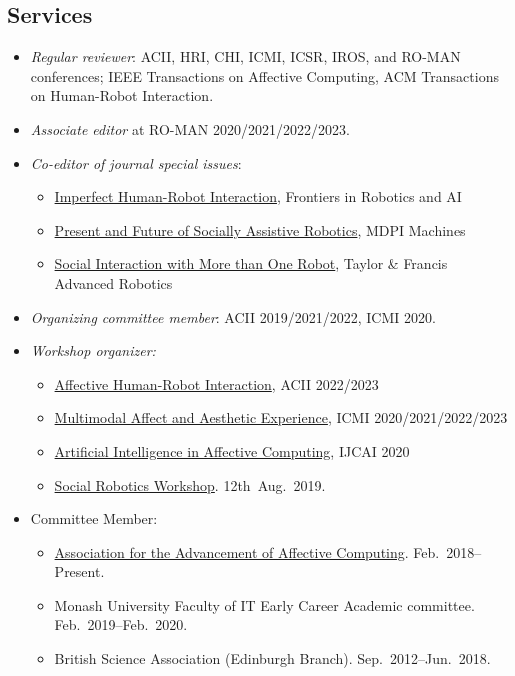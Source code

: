 \documentclass[11pt,letterpaper]{article}
\begin{document}
\subsection*{Services}
\begin{itemize}
  \item \emph{Regular reviewer}: ACII, HRI, CHI, ICMI, ICSR, IROS, and RO-MAN conferences; IEEE Transactions on Affective Computing, ACM Transactions on Human-Robot Interaction.
  \item \emph{Associate editor} at RO-MAN 2020/2021/2022/2023.
  \item \emph{Co-editor of journal special issues}:
  \begin{itemize}
  	\item \href{https://www.frontiersin.org/research-topics/41423/imperfect-human-robot-interactions}{Imperfect Human-Robot Interaction}, Frontiers in Robotics and AI
  	\item \href{https://www.mdpi.com/journal/machines/special_issues/LY20492KE2}{Present and Future of Socially Assistive Robotics}, MDPI Machines
  	\item \href{https://think.taylorandfrancis.com/special_issues/advanced-robotics-social-interaction/?utm_source=TFO&utm_medium=cms&utm_campaign=JPG15743}{Social Interaction with More than One Robot}, Taylor \& Francis Advanced Robotics
  \end{itemize} 
  \item \emph{Organizing committee member}: ACII 2019/2021/2022, ICMI 2020.
  \item \emph{Workshop organizer:}
  \begin{itemize}
  	\item \href{https://www.a-hri.me/}{Affective Human-Robot Interaction}, ACII 2022/2023
  	\item \href{https://sites.google.com/view/maae2022/home?authuser=0}{Multimodal Affect and Aesthetic Experience}, ICMI 2020/2021/2022/2023
  	\item \href{https://kdd.cs.ksu.edu/Workshops/IJCAI-2020-AffComp/}{Artificial Intelligence in Affective Computing}, IJCAI 2020
  	\item \href{https://sites.google.com/monash.edu/socialroboticsworkshop/home}{Social Robotics Workshop}. 12th~Aug.~2019.
  \end{itemize}
  \item Committee Member:
  \begin{itemize} 
    \item \href{https://aaac.world/}{Association for the Advancement of Affective Computing}. Feb.~2018--Present.
    \item Monash University Faculty of IT Early Career Academic committee. Feb.~2019--Feb.~2020.
    \item British Science Association (Edinburgh Branch). Sep.~2012--Jun.~2018.
  \end{itemize}
\end{itemize}
\end{document}
